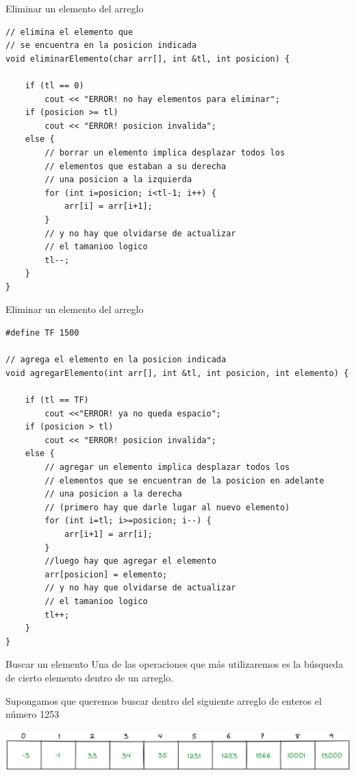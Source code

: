 \documentclass[12pt]{beamer}
\begin{document}
\begin{frame}[fragile]{Eliminar un elemento del arreglo}
\begin{lstlisting}[basicstyle=\scriptsize]
// elimina el elemento que 
// se encuentra en la posicion indicada
void eliminarElemento(char arr[], int &tl, int posicion) {
    
    if (tl == 0)
        cout << "ERROR! no hay elementos para eliminar";
    if (posicion >= tl)
        cout << "ERROR! posicion invalida";
    else {
        // borrar un elemento implica desplazar todos los 
        // elementos que estaban a su derecha
        // una posicion a la izquierda
        for (int i=posicion; i<tl-1; i++) {
            arr[i] = arr[i+1];
        }
        // y no hay que olvidarse de actualizar
        // el tamanioo logico
        tl--;
    }
}
\end{lstlisting}
\end{frame}
    
\begin{frame}[fragile]{Eliminar un elemento del arreglo}
\begin{lstlisting}[basicstyle=\tiny]
#define TF 1500

// agrega el elemento en la posicion indicada
void agregarElemento(int arr[], int &tl, int posicion, int elemento) {
    
    if (tl == TF)
        cout <<"ERROR! ya no queda espacio";
    if (posicion > tl)
        cout << "ERROR! posicion invalida";
    else {
        // agregar un elemento implica desplazar todos los 
        // elementos que se encuentran de la posicion en adelante
        // una posicion a la derecha
        // (primero hay que darle lugar al nuevo elemento)
        for (int i=tl; i>=posicion; i--) {
            arr[i+1] = arr[i];
        }
        //luego hay que agregar el elemento
        arr[posicion] = elemento;
        // y no hay que olvidarse de actualizar
        // el tamanioo logico
        tl++;
    }
}
\end{lstlisting}
\end{frame}

\begin{frame}{Buscar un elemento}
    Una de las operaciones que más utilizaremos es la \alert{búsqueda} de cierto elemento dentro de un arreglo.
    
    \medskip
    
    Supongamos que queremos buscar dentro del siguiente arreglo de enteros el número \alert{1253}
    
    \medskip
    
    \includegraphics[width=\textwidth]{arreglo_inicial_busqueda.png}
\end{frame}
\end{document}

